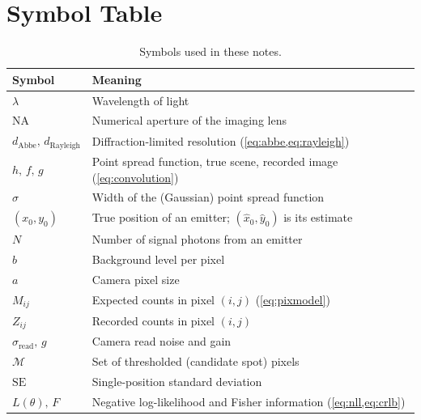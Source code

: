 \documentclass[11pt,a4paper]{article}
\begin{document}
\section{Symbol Table}
\label{sec:symbols}

\begin{table}[htbp]
\centering\small
\begin{tabularx}{\linewidth}{@{}lX@{}}
\toprule
\textbf{Symbol} & \textbf{Meaning}\\
\midrule
$\lambda$ & Wavelength of light\\
$\mathrm{NA}$ & Numerical aperture of the imaging lens\\
$d_{\mathrm{Abbe}},\,d_{\mathrm{Rayleigh}}$ & Diffraction-limited resolution
  (\cref{eq:abbe,eq:rayleigh})\\
$h,\,f,\,g$ & Point spread function, true scene, recorded image
  (\cref{eq:convolution})\\
$\sigma$ & Width of the (Gaussian) point spread function\\
$(x_0,y_0)$ & True position of an emitter; $(\hat{x}_0,\hat{y}_0)$ is its estimate\\
$N$ & Number of signal photons from an emitter\\
$b$ & Background level per pixel\\
$a$ & Camera pixel size\\
$M_{ij}$ & Expected counts in pixel $(i,j)$ (\cref{eq:pixmodel})\\
$Z_{ij}$ & Recorded counts in pixel $(i,j)$\\
$\sigma_{\mathrm{read}},\,g$ & Camera read noise and gain\\
$\mathcal{M}$ & Set of thresholded (candidate spot) pixels\\
$\mathrm{SE}$ & Single-position standard deviation\\
$L(\theta),\,F$ & Negative log-likelihood and Fisher information
  (\cref{eq:nll,eq:crlb})\\
\bottomrule
\end{tabularx}
\caption{Symbols used in these notes.}
\label{tab:symbols}
\end{table}
\end{document}
